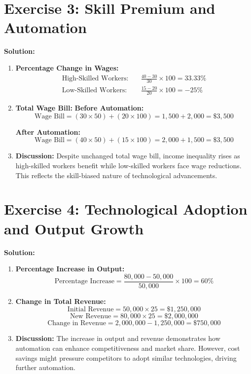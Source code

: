 \documentclass[12pt]{article}
\begin{document}
\section*{Exercise 3: Skill Premium and Automation}
\textbf{Solution:}
\begin{enumerate}
    \item \textbf{Percentage Change in Wages:}
    \begin{align*}
    \text{High-Skilled Workers:} & \quad \frac{40 - 30}{30} \times 100 = 33.33\% \\
    \text{Low-Skilled Workers:} & \quad \frac{15 - 20}{20} \times 100 = -25\%
    \end{align*}
    
    \item \textbf{Total Wage Bill:}
    \textbf{Before Automation:}
    \[ \text{Wage Bill} = (30 \times 50) + (20 \times 100) = 1,500 + 2,000 = \$3,500 \]
    
    \textbf{After Automation:}
    \[ \text{Wage Bill} = (40 \times 50) + (15 \times 100) = 2,000 + 1,500 = \$3,500 \]
    
    \item \textbf{Discussion:}
    Despite unchanged total wage bill, income inequality rises as high-skilled workers benefit while low-skilled workers face wage reductions. This reflects the skill-biased nature of technological advancements.
\end{enumerate}

\section*{Exercise 4: Technological Adoption and Output Growth}
\textbf{Solution:}
\begin{enumerate}
    \item \textbf{Percentage Increase in Output:}
    \[ \text{Percentage Increase} = \frac{80,000 - 50,000}{50,000} \times 100 = 60\% \]
    
    \item \textbf{Change in Total Revenue:}
    \[ \text{Initial Revenue} = 50,000 \times 25 = \$1,250,000 \]
    \[ \text{New Revenue} = 80,000 \times 25 = \$2,000,000 \]
    \[ \text{Change in Revenue} = 2,000,000 - 1,250,000 = \$750,000 \]
    
    \item \textbf{Discussion:}
    The increase in output and revenue demonstrates how automation can enhance competitiveness and market share. However, cost savings might pressure competitors to adopt similar technologies, driving further automation.
\end{enumerate}
\end{document}
